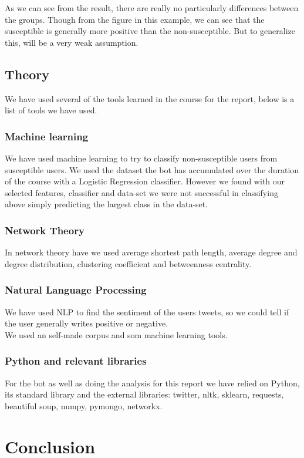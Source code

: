 \documentclass[10pt]{IEEEtran}
\begin{document}
As we can see from the result, there are really no particularly differences between the groups. Though from the figure in this example, we can see that the susceptible is generally more positive than the non-susceptible. But to generalize this, will be a very weak assumption. 

\subsection{Theory}
We have used several of the tools learned in the course for the report, below is a list of tools we have used.\\
\subsubsection{Machine learning}
We have used machine learning to try to classify non-susceptible users from susceptible users. We used the dataset the bot has accumulated over the duration of the course with a Logistic Regression classifier. However we found with our selected features, classifier and data-set we were not successful in classifying above simply predicting the largest class in the data-set.\\
\subsubsection{Network Theory}
In network theory have we used average shortest path length, average degree and degree distribution, clustering coefficient and betweenness centrality. \\
\subsubsection{Natural Language Processing}
We have used NLP to find the sentiment of the users tweets, so we could tell if the user generally writes positive or negative.\\
We used an self-made corpus and som machine learning tools. \\
\subsubsection{Python and relevant libraries}
For the bot as well as doing the analysis for this report we have relied on Python, its standard library and the external libraries: twitter, nltk, sklearn, requests, beautiful soup, numpy, pymongo, networkx.
\section{Conclusion}
\end{document}

